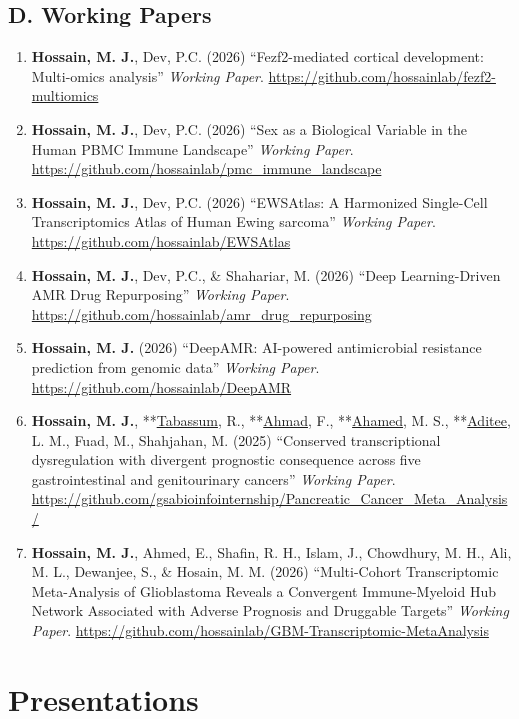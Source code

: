 \documentclass[
  11pt,
  letterpaper,
  DIV=11,
  numbers=noendperiod]{scrartcl}
\providecommand{\tightlist}{%
  \setlength{\itemsep}{0pt}\setlength{\parskip}{0pt}}
\begin{document}
\subsection{D. Working Papers}\label{d.-working-papers}

\begin{enumerate}
\def\labelenumi{\arabic{enumi}.}
\tightlist
\item
  \textbf{Hossain, M. J.}, Dev, P.C. (2026) ``Fezf2-mediated cortical
  development: Multi-omics analysis'' \emph{Working Paper}.
  \url{https://github.com/hossainlab/fezf2-multiomics}
\item
  \textbf{Hossain, M. J.}, Dev, P.C. (2026) ``Sex as a Biological
  Variable in the Human PBMC Immune Landscape'' \emph{Working Paper}.
  \url{https://github.com/hossainlab/pmc_immune_landscape}
\item
  \textbf{Hossain, M. J.}, Dev, P.C. (2026) ``EWSAtlas: A Harmonized
  Single-Cell Transcriptomics Atlas of Human Ewing sarcoma''
  \emph{Working Paper}. \url{https://github.com/hossainlab/EWSAtlas}
\item
  \textbf{Hossain, M. J.}, Dev, P.C., \& Shahariar, M. (2026) ``Deep
  Learning-Driven AMR Drug Repurposing'' \emph{Working Paper}.
  \url{https://github.com/hossainlab/amr_drug_repurposing}
\item
  \textbf{Hossain, M. J.} (2026) ``DeepAMR: AI-powered antimicrobial
  resistance prediction from genomic data'' \emph{Working Paper}.
  \url{https://github.com/hossainlab/DeepAMR}
\item
  \textbf{Hossain, M. J.}, **\underline{Tabassum}, R.,
  **\underline{Ahmad}, F., **\underline{Ahamed}, M. S.,
  **\underline{Aditee}, L. M., Fuad, M., Shahjahan, M. (2025)
  ``Conserved transcriptional dysregulation with divergent prognostic
  consequence across five gastrointestinal and genitourinary cancers''
  \emph{Working Paper}.
  \url{https://github.com/gsabioinfointernship/Pancreatic_Cancer_Meta_Analysis/}
\item
  \textbf{Hossain, M. J.}, Ahmed, E., Shafin, R. H., Islam, J.,
  Chowdhury, M. H., Ali, M. L., Dewanjee, S., \& Hosain, M. M. (2026)
  ``Multi-Cohort Transcriptomic Meta-Analysis of Glioblastoma Reveals a
  Convergent Immune-Myeloid Hub Network Associated with Adverse
  Prognosis and Druggable Targets'' \emph{Working Paper}.
  \url{https://github.com/hossainlab/GBM-Transcriptomic-MetaAnalysis}
\end{enumerate}

\section{Presentations}\label{presentations}
\end{document}
